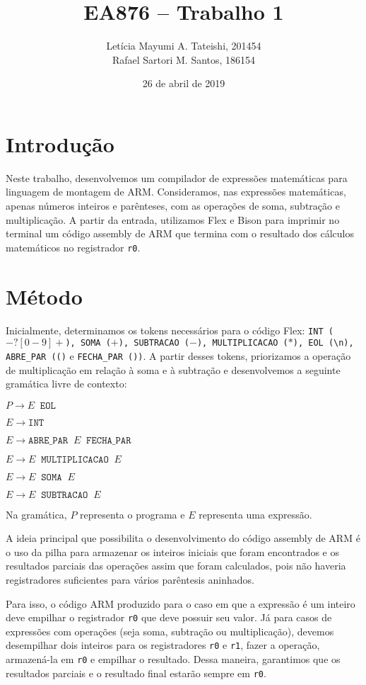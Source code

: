 \documentclass[brazilian,a4paper,twocolumn]{article}
\title{EA876 -- Trabalho 1}
\author{Letícia Mayumi A. Tateishi, 201454\\Rafael Sartori M. Santos, 186154}
\date{26 de abril de 2019}
\newcommand{\s}{\;\;}
\begin{document}
\maketitle

\section{Introdução}

    Neste trabalho, desenvolvemos um compilador de expressões matemáticas para linguagem de montagem de ARM. Consideramos, nas expressões matemáticas, apenas números inteiros e parênteses, com as operações de soma, subtração e multiplicação. A partir da entrada, utilizamos Flex e Bison para imprimir no terminal um código assembly de ARM que termina com o resultado dos cálculos matemáticos no registrador \texttt{r0}.

\section{Método}

    Inicialmente, determinamos os tokens necessários para o código Flex: \texttt{INT ($-?[0-9]+$), SOMA ($+$), SUBTRACAO ($-$), MULTIPLICACAO ($*$), EOL (\textbackslash{}n), ABRE\_PAR (()} e \texttt{FECHA\_PAR ())}. A partir desses tokens, priorizamos a operação de multiplicação em relação à soma e à subtração e desenvolvemos a seguinte gramática livre de contexto:

    $P \xrightarrow{} E \s \texttt{EOL}$

    $E \xrightarrow{} \texttt{INT}$

    $E \xrightarrow{} \texttt{ABRE\_PAR} \s E \s \texttt{FECHA\_PAR}$

    $E \xrightarrow{} E \s \texttt{MULTIPLICACAO} \s E$

    $E \xrightarrow{} E \s \texttt{SOMA} \s E$

    $E \xrightarrow{} E \s \texttt{SUBTRACAO} \s E$

    Na gramática, $P$ representa o programa e $E$ representa uma expressão.

    A ideia principal que possibilita o desenvolvimento do código assembly de ARM é o uso da pilha para armazenar os inteiros iniciais que foram encontrados e os resultados parciais das operações assim que foram calculados, pois não haveria registradores suficientes para vários parêntesis aninhados.

    Para isso, o código ARM produzido para o caso em que a expressão é um inteiro deve empilhar o registrador \texttt{r0} que deve possuir seu valor. Já para casos de expressões com operações (seja soma, subtração ou multiplicação), devemos desempilhar dois inteiros para os registradores \texttt{r0} e \texttt{r1}, fazer a operação, armazená-la em \texttt{r0} e empilhar o resultado. Dessa maneira, garantimos que os resultados parciais e o resultado final estarão sempre em \texttt{r0}.
\end{document}
